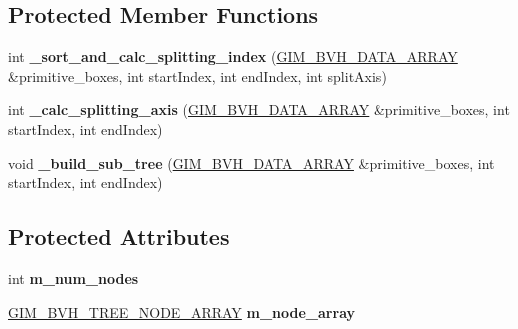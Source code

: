 \subsection*{Protected Member Functions}
\begin{DoxyCompactItemize}
\item 
\hypertarget{classbt_bvh_tree_adab83b12f4b402cfb5993229464bb5bf}{int {\bfseries \+\_\+sort\+\_\+and\+\_\+calc\+\_\+splitting\+\_\+index} (\hyperlink{class_g_i_m___b_v_h___d_a_t_a___a_r_r_a_y}{G\+I\+M\+\_\+\+B\+V\+H\+\_\+\+D\+A\+T\+A\+\_\+\+A\+R\+R\+A\+Y} \&primitive\+\_\+boxes, int start\+Index, int end\+Index, int split\+Axis)}\label{classbt_bvh_tree_adab83b12f4b402cfb5993229464bb5bf}

\item 
\hypertarget{classbt_bvh_tree_a0a4c7b8aac4746d61db57943813897ae}{int {\bfseries \+\_\+calc\+\_\+splitting\+\_\+axis} (\hyperlink{class_g_i_m___b_v_h___d_a_t_a___a_r_r_a_y}{G\+I\+M\+\_\+\+B\+V\+H\+\_\+\+D\+A\+T\+A\+\_\+\+A\+R\+R\+A\+Y} \&primitive\+\_\+boxes, int start\+Index, int end\+Index)}\label{classbt_bvh_tree_a0a4c7b8aac4746d61db57943813897ae}

\item 
\hypertarget{classbt_bvh_tree_a04dbb29969ae7bdedc06d650b5f35932}{void {\bfseries \+\_\+build\+\_\+sub\+\_\+tree} (\hyperlink{class_g_i_m___b_v_h___d_a_t_a___a_r_r_a_y}{G\+I\+M\+\_\+\+B\+V\+H\+\_\+\+D\+A\+T\+A\+\_\+\+A\+R\+R\+A\+Y} \&primitive\+\_\+boxes, int start\+Index, int end\+Index)}\label{classbt_bvh_tree_a04dbb29969ae7bdedc06d650b5f35932}

\end{DoxyCompactItemize}
\subsection*{Protected Attributes}
\begin{DoxyCompactItemize}
\item 
\hypertarget{classbt_bvh_tree_a2d08e4099671e71c48786c26f7cd554a}{int {\bfseries m\+\_\+num\+\_\+nodes}}\label{classbt_bvh_tree_a2d08e4099671e71c48786c26f7cd554a}

\item 
\hypertarget{classbt_bvh_tree_a0b90eb3e890f84648f7c3b7ca52fefb7}{\hyperlink{class_g_i_m___b_v_h___t_r_e_e___n_o_d_e___a_r_r_a_y}{G\+I\+M\+\_\+\+B\+V\+H\+\_\+\+T\+R\+E\+E\+\_\+\+N\+O\+D\+E\+\_\+\+A\+R\+R\+A\+Y} {\bfseries m\+\_\+node\+\_\+array}}\label{classbt_bvh_tree_a0b90eb3e890f84648f7c3b7ca52fefb7}

\end{DoxyCompactItemize}


